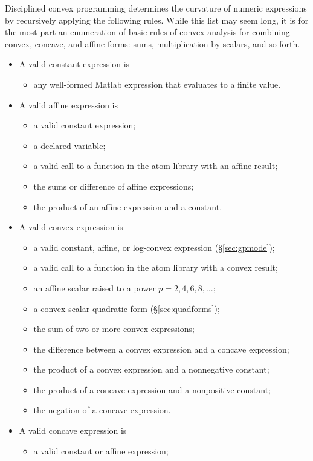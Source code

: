 \documentclass[12pt]{article}
\begin{document}
Disciplined convex programming determines the curvature of numeric
expressions by recursively applying the following rules.
While this list may seem long, it is for the most part an enumeration of basic
rules of convex analysis for combining convex, concave, and affine forms: sums,
multiplication by scalars, and so forth.
\begin{itemize}
\item A valid constant expression is
\begin{itemize}
\item any well-formed Matlab expression that 
evaluates to a finite value.
\end{itemize}
\item A valid affine expression is
\begin{itemize}
\item a valid constant expression;
\item a declared variable;
\item a valid call to a function in the atom library with an affine result;
\item the sums or difference of affine expressions;
\item the product of an affine expression and a constant.
\end{itemize}
\item A valid convex expression is
\begin{itemize}
\item a valid constant, affine, or log-convex expression 
(\S\ref{sec:gpmode});
\item a valid call to a function in the atom library with a convex result;
\item an affine scalar raised to a power $p=2,4,6,8,...$;
\item a convex scalar quadratic form (\S\ref{sec:quadforms});
\item the sum of two or more convex expressions;
\item the difference between a convex expression and a concave expression;
\item the product of a convex expression and a nonnegative constant;
\item the product of a concave expression and a nonpositive constant;
\item the negation of a concave expression.
\end{itemize}
\item A valid concave expression is
\begin{itemize}
\item a valid constant or affine expression;

\end{itemize}
\end{itemize}
\end{document}
